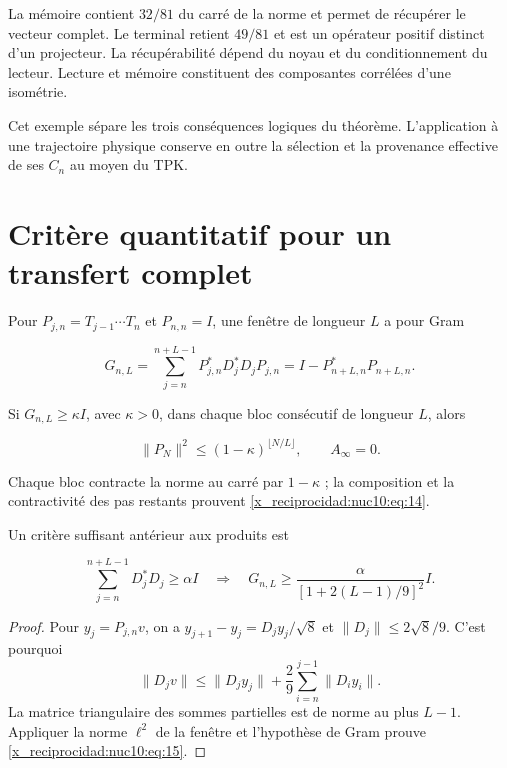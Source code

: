 La mémoire contient \(32/81\) du carré de la norme et permet de récupérer le vecteur complet. Le terminal retient \(49/81\) et est un opérateur positif distinct d’un projecteur. La récupérabilité dépend du noyau et du conditionnement du lecteur. Lecture et mémoire constituent des composantes corrélées d’une isométrie.

Cet exemple sépare les trois conséquences logiques du théorème. L’application
à une trajectoire physique conserve en outre la sélection et la
provenance effective de ses \(C_n\) au moyen du TPK.

\section{Critère quantitatif pour un transfert complet}

Pour \(P_{j,n}=T_{j-1}\cdots T_n\) et \(P_{n,n}=I\), une fenêtre de longueur \(L\) a pour Gram



\[
G_{n,L}=\sum_{j=n}^{n+L-1}P_{j,n}^*D_j^*D_jP_{j,n}
=I-P_{n+L,n}^*P_{n+L,n}.
\]



Si \(G_{n,L}\geq\kappa I\), avec \(\kappa>0\), dans chaque bloc consécutif de longueur \(L\), alors



\begin{equation}
\|P_N\|^2\le(1-\kappa)^{\lfloor N/L\rfloor},\qquad A_\infty=0.
\label{x_reciprocidad:nuc10:eq:14}
\end{equation}



Chaque bloc contracte la norme au carré par \(1-\kappa\) ; la composition et la contractivité des pas restants prouvent \eqref{x_reciprocidad:nuc10:eq:14}.

Un critère suffisant antérieur aux produits est



\begin{equation}
\sum_{j=n}^{n+L-1}D_j^*D_j\ge\alpha I
\quad\Longrightarrow\quad
G_{n,L}\ge\frac{\alpha}{[1+2(L-1)/9]^2}I.
\label{x_reciprocidad:nuc10:eq:15}
\end{equation}



\begin{proof}
Pour \(y_j=P_{j,n}v\), on a
\(y_{j+1}-y_j=D_jy_j/\sqrt8\) et \(\|D_j\|\leq2\sqrt8/9\). C’est pourquoi
\[
\|D_jv\|\leq\|D_jy_j\|+\frac29\sum_{i=n}^{j-1}\|D_iy_i\|.
\]
La matrice triangulaire des sommes partielles est de norme au plus \(L-1\).
Appliquer la norme \(\ell^2\) de la fenêtre et l’hypothèse de Gram prouve \eqref{x_reciprocidad:nuc10:eq:15}.

\end{proof}

